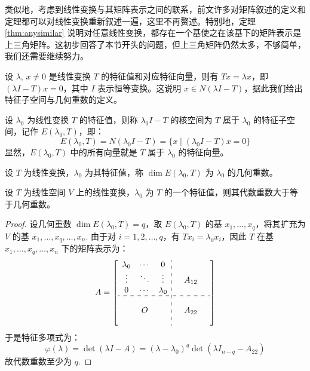 类似地，考虑到线性变换与其矩阵表示之间的联系，前文许多对矩阵叙述的定义和定理都可以对线性变换重新叙述一遍，这里不再赘述。特别地，定理 \ref{thm:anysimilar} 说明对任意线性变换，都存在一个基使之在该基下的矩阵表示是上三角矩阵。这初步回答了本节开头的问题，但上三角矩阵仍然太多，不够简单，我们还需要继续努力。

设 $\lambda,\,x\neq0$ 是线性变换 $T$ 的特征值和对应特征向量，则有 $Tx=\lambda x$，即 $(\lambda I-T)x=0$，其中 $I$ 表示恒等变换。这说明 $x\in N(\lambda I-T)$，据此我们给出特征子空间与几何重数的定义。

\begin{definition}[特征子空间]
设 $\lambda_0$ 为线性变换 $T$ 的特征值，则称 $\lambda_0I-T$ 的核空间为 $T$ 属于 $\lambda_0$ 的特征子空间，记作 $E(\lambda_0,T)$，即：
\[
    E(\lambda_0,T)=N(\lambda_0I-T)=\{x\mid(\lambda_0 I-T)x=0\}
\]
显然，$E(\lambda_0,T)$ 中的所有向量就是 $T$ 属于 $\lambda_0$ 的特征向量。
\end{definition}

\begin{definition}[几何重数]
设 $T$ 为线性变换，$\lambda_0$ 为其特征值，称 $\dim E(\lambda_0,T)$ 为 $\lambda_0$ 的几何重数。
\end{definition}

\begin{theorem}
设 $T$ 为线性空间 $V$ 上的线性变换，$\lambda_0$ 为 $T$ 的一个特征值，则其代数重数大于等于几何重数。
\end{theorem}
\begin{proof}
设几何重数 $\dim E(\lambda_0,T)=q$，取 $E(\lambda_0,T)$ 的基 $x_1,\ldots,x_q$，将其扩充为 $V$ 的基 $x_1,\ldots,x_q,\ldots,x_n$. 由于对 $i=1,2,\ldots,q$，有 $Tx_i=\lambda_0x_i$，因此 $T$ 在基 $x_1,\ldots,x_q,\ldots,x_n$ 下的矩阵表示为：
\[
    A=\left[\begin{array}{ccc:ccc}
    \lambda_0 & \cdots & 0         & &        & \\
    \vdots    & \ddots & \vdots    & & A_{12} & \\
    0         & \cdots & \lambda_0 & &        & \\ \hdashline
              &        &           & &        & \\
              & O      &           & & A_{22} & \\
              &        &           & &        & \\
    \end{array}\right]
\]
于是特征多项式为：
\[
    \varphi(\lambda)=\det(\lambda I-A)=(\lambda-\lambda_0)^q\det(\lambda I_{n-q}-A_{22})
\]
故代数重数至少为 $q$.
\end{proof}

